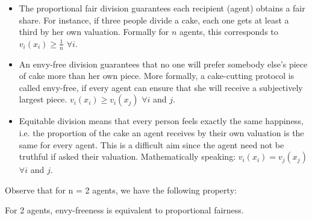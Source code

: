 \begin{itemize}
\item The proportional fair division guarantees each recipient (agent) obtains a fair share. 
For instance, if three people divide a cake, each one gets at least a third by her own valuation. 
Formally  for $n$ agents, this corresponds to $v_i(x_i) \geq \frac{1}{n}$ $\forall i$.
\item An envy-free division guarantees that no one will prefer somebody else's piece of cake more than her own piece. 
More formally,  a cake-cutting protocol is called envy-free, if every agent can ensure that she will receive a subjectively largest piece.
 $v_i(x_i) \geq v_i(x_j)$ $\forall i$ and $j$.
\item Equitable division means that every person feels exactly the same happiness, 
i.e. the proportion of the cake an agent receives by their own valuation is the same for every agent. 
This is a difficult aim since the agent need not be truthful if asked their valuation.
Mathematically speaking:  $v_i(x_i) = v_j(x_j)$ $\forall i$ and $j$.
 \end{itemize}

\bigskip

Observe that for n = 2 agents, we have the following property:

\begin{prop}
For 2 agents, envy-freeness is equivalent to proportional fairness.
\end{prop}

